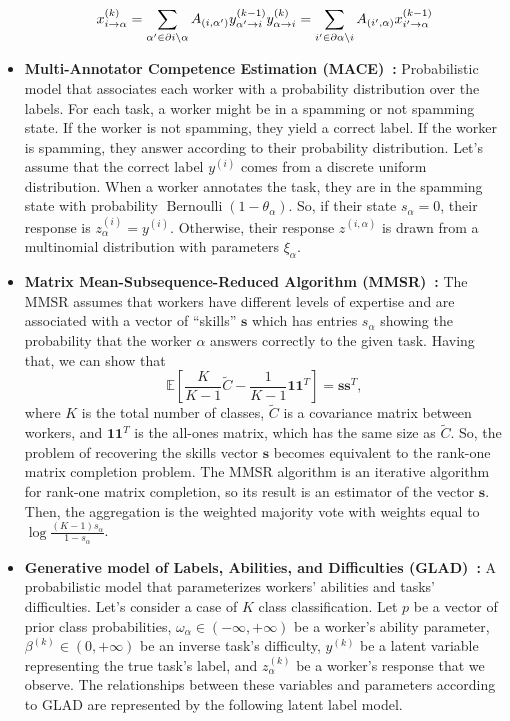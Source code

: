 \documentclass[sn-nature]{bst/sn-jnl}
\begin{document}
\begin{itemize}
\begin{equation}
        x_{i \rightarrow \alpha}^{(k)} = \sum_{\alpha' \in \partial i \backslash \alpha} A_{(i, \alpha')} y_{\alpha' \rightarrow i}^{(k-1)} \\
        y_{\alpha \rightarrow i}^{(k)} = \sum_{i' \in \partial \alpha \backslash i} A_{(i',\alpha)} x_{i' \rightarrow \alpha}^{(k-1)}
    \end{equation}
    \item \textbf{Multi-Annotator Competence Estimation (MACE)~\cite{hovy_MACE_2013,crowdkit_webpage_documentation}:}
    Probabilistic model that associates each worker with a probability distribution over the labels. For each task, a worker might be in a spamming or not spamming state. If the worker is not spamming, they yield a correct label. If the worker is spamming, they answer according to their probability distribution. Let's assume that the correct label $y^{(i)}$ comes from a discrete uniform distribution. When a worker annotates the task, they are in the spamming state with probability $\operatorname{Bernoulli}(1 - \theta_{\alpha})$. So, if their state $s_{\alpha} = 0$, their response is $z^{(i)}_{\alpha} = y^{(i)}$. Otherwise, their response $z^{(i,\alpha)}$ is drawn from a multinomial distribution with parameters $\xi_{\alpha}$.
    \item \textbf{Matrix Mean-Subsequence-Reduced Algorithm (MMSR)~\cite{ma_Adversarial_2020,crowdkit_webpage_documentation}:} The MMSR assumes that workers have different levels of expertise and are associated with a vector of ``skills'' $\boldsymbol{s}$ which has entries $s_{\alpha}$ showing the probability that the worker $\alpha$ answers correctly to the given task. Having that, we can show that%
    \begin{equation}
        \mathbb{E}\left[\frac{K}{K-1}\widetilde{C}-\frac{1}{K-1}\boldsymbol{1}\boldsymbol{1}^T\right]
        = \boldsymbol{s}\boldsymbol{s}^T,
    \end{equation}
    where $K$ is the total number of classes, $\widetilde{C}$ is a covariance matrix between workers, and $\boldsymbol{1}\boldsymbol{1}^T$ is the all-ones matrix, which has the same size as $\widetilde{C}$.
    So, the problem of recovering the skills vector $\boldsymbol{s}$ becomes equivalent to the rank-one matrix completion problem. The MMSR algorithm is an iterative algorithm for rank-one matrix completion, so its result is an estimator of the vector $\boldsymbol{s}$. Then, the aggregation is the weighted majority vote with weights equal to $\log \frac{(K-1)s_{\alpha}}{1-s_{\alpha}}$.
    \item \textbf{Generative model of Labels, Abilities, and Difficulties (GLAD)~\cite{whitehill_Whose_2009,crowdkit_webpage_documentation}:} A probabilistic model that parameterizes workers' abilities and tasks' difficulties. Let's consider a case of $K$ class classification. Let $p$ be a vector of prior class probabilities, $\omega_{\alpha} \in (-\infty, +\infty)$ be a worker's ability parameter, $\beta^{(k)} \in (0, +\infty)$ be an inverse task's difficulty, $y^{(k)}$ be a latent variable representing the true task's label, and $z_{\alpha}^{(k)}$ be a worker's response that we observe. The relationships between these variables and parameters according to GLAD are represented by the following latent label model.

\end{itemize}
\end{document}
